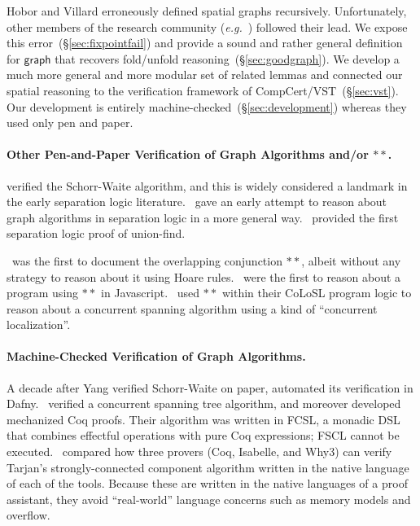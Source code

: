 \documentclass[acmsmall,screen]{acmart}
\newcommand{\p}[1]{\ensuremath{\mathsf{#1}}} \newcommand{\m}[1]{\ensuremath{\mathit{#1}}} \newcommand{\ma}[1]{\ensuremath{\mathcal{#1}}} \let\ramify\lightning
\begin{document}
Hobor and Villard erroneously defined spatial graphs
recursively. Unfortunately, other members of the research
community (\emph{e.g.}~\citet{raadvg15}) followed their lead.  We expose this
error~(\S\ref{sec:fixpointfail}) and provide a sound and rather general definition for
\p{graph} that recovers fold/unfold reasoning~(\S\ref{sec:goodgraph}).  We develop a
much more general and more modular set of related lemmas and connected our spatial
reasoning to the verification framework of CompCert/VST~(\S\ref{sec:vst}).
Our development is entirely
machine-checked~(\S\ref{sec:development}) whereas they used only pen and paper.

\paragraph{Other Pen-and-Paper Verification of Graph Algorithms and/or $**$.}

\citet{hongseok:phd} verified the Schorr-Waite algorithm, and this 
is widely considered a landmark in the early separation logic literature. 
\citet{bornat:aliasing04}~gave an early attempt to reason about graph algorithms 
in separation logic in a more general way. 
\citet{neelthesis}~provided the first separation logic proof of union-find.

\citet{rey-slnotes}~was the first to document the overlapping 
conjunction $**$, albeit without any strategy to reason about it using Hoare rules. 
\citet{gardnerms12}~were the first to reason about a program using $**$ in 
Javascript. 
\citet{raadvg15}~used $**$ within their CoLoSL program logic to reason about 
a concurrent spanning algorithm using a kind of ``concurrent localization''.



\paragraph{Machine-Checked Verification of Graph Algorithms.}
A decade after Yang verified Schorr-Waite on paper, \citet{leino10} automated 
its verification in Dafny. 
\citet{ilya-graphs}~verified a concurrent spanning tree algorithm, and 
moreover developed mechanized Coq proofs. Their algorithm was written in FCSL, 
a monadic DSL that combines effectful operations with pure Coq expressions; 
FSCL cannot be executed. 
\citet{chen18}~compared how three provers (Coq, Isabelle, and Why3) can 
verify Tarjan’s strongly-connected component algorithm written in the native 
language of each of the tools. Because these are written in the native languages 
of a proof assistant, they avoid “real-world” language concerns such as 
memory models and overflow.
\end{document}
